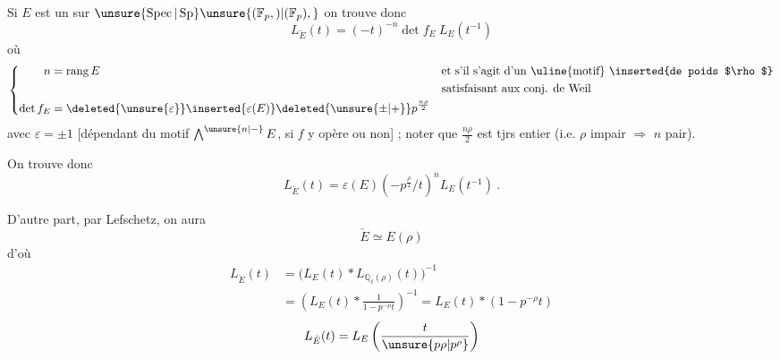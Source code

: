 Si $E$ est un  sur $\unsure{\operatorname{Spec}|\operatorname{Sp}}\unsure{(\mathbb{F}_p,)|(\mathbb{F}_p),}$  on trouve donc
\[
L_{\check E}(t)=(-t)^{-n}\det f_E\ L_E(t^{-1})
\]
où
\[
\left\{\begin{aligned}
n&=\operatorname{rang} E
  &&\text{et s'il s'agit d'un \uline{motif} \inserted{de poids $\rho$}}\\
 &&&\text{satisfaisant aux conj. de Weil}\\
\det f_E&=\deleted{\unsure{\varepsilon}}\inserted{\varepsilon(E)}\deleted{\unsure{\pm|+}}p^{\frac{n\rho}{2}}
\end{aligned}\right.
\]
avec $\varepsilon=\pm1$ [dépendant du motif $\bigwedge^{\unsure{n|{-}}}E$,  si $f$ y opère  ou non] ; noter que $\frac{n\rho}{2}$ est tjrs entier (i.e. $\rho$ impair $\Longrightarrow$ $n$ pair).

On trouve donc
\[
L_{\check E}(t)=\varepsilon(E)(-p^{\frac{\rho}{2}}/t)^n L_E(t^{-1})\ .
\]

D'autre part, par Lefschetz, on aura
\[
\check E\simeq E(\rho)
\]
d'où
\[
\begin{aligned}
L_{\check E}(t)&=\bigl(L_E(t)\ast L_{\mathbb{Q}_{\ell}(\rho)}(t)\bigr)^{-1}\\
&=\left(L_E(t)\ast\frac{1}{1-p^{-\rho}t}\right)^{-1}=L_E(t)\ast(1-p^{-\rho}t)
\end{aligned}
\]
\[
L_{\check E}(t)=L_E\left(\frac{t}{\unsure{p\rho|p^\rho}}\right)
\]

